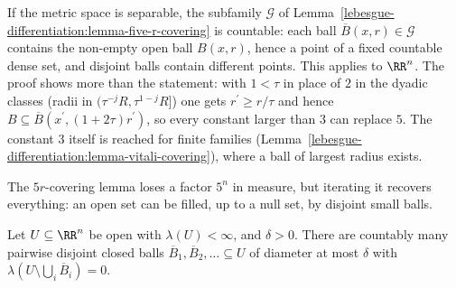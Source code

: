 \begin{remark}\label{lebesgue-differentiation:remark-five-r-countable}
If the metric space is separable, the subfamily $\mathcal{G}$ of Lemma~\ref{lebesgue-differentiation:lemma-five-r-covering} is countable: each ball $\overline{B}(x, r) \in \mathcal{G}$ contains the
non-empty open ball $B(x, r)$, hence a point of a fixed countable dense set, and disjoint balls contain different points. This applies to $\RR^n$. The proof shows more than the statement: with
$1 < \tau$ in place of $2$ in the dyadic classes (radii in $(\tau^{-j}R, \tau^{1-j}R]$) one gets $r^{\prime} \geq r/\tau$ and hence $B \subseteq \overline{B}(x^{\prime}, (1 + 2\tau)r^{\prime})$, so every
constant larger than $3$ can replace $5$. The constant $3$ itself is reached for finite families (Lemma~\ref{lebesgue-differentiation:lemma-vitali-covering}), where a ball of largest radius exists.
\end{remark}

The $5r$-covering lemma loses a factor $5^n$ in measure, but iterating it recovers everything: an open set can be filled, up to a null set, by disjoint small balls.

\begin{theorem}\label{lebesgue-differentiation:theorem-vitali-covering}
Let $U \subseteq \RR^n$ be open with $\lambda(U) < \infty$, and $\delta > 0$. There are countably many pairwise disjoint closed balls $\overline{B}_1, \overline{B}_2, \ldots \subseteq U$ of diameter at most $\delta$
with $\lambda(U \setminus \bigcup_i\overline{B}_i) = 0$.
\end{theorem}

